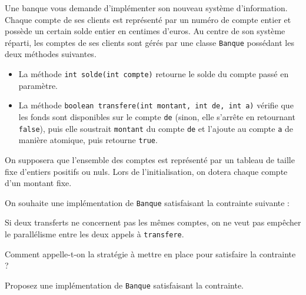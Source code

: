 
\begingroup

\begin{exercice}
  \label{exo:blocking/bank}
  
  Une banque vous demande d'implémenter son nouveau système d'information.
  Chaque compte de ses clients est représenté par un numéro de compte entier et possède un
  certain solde entier en centimes d'euros.
  Au centre de son système réparti, les comptes de ses clients sont gérés
  par une classe \lstinline{Banque} possédant les deux méthodes suivantes.

  \begin{itemize}
  \item La méthode \lstinline{int solde(int compte)} retourne le solde du compte passé en paramètre.
  \item La méthode \lstinline{boolean transfere(int montant, int de, int a)} vérifie que les fonds sont disponibles sur le compte \lstinline{de}
    (sinon, elle s'arrête en retournant \lstinline{false}), puis elle soustrait \lstinline{montant} du compte \lstinline{de} et l'ajoute
    au compte \lstinline{a} de manière atomique, puis retourne \lstinline{true}.
  \end{itemize}
  
  On supposera que l'ensemble des comptes est représenté par un tableau de taille fixe
  d'entiers positifs ou nuls. Lors de l'initialisation, on dotera chaque compte d'un montant fixe.

  On souhaite une implémentation de \lstinline{Banque} satisfaisant la contrainte suivante :
  
  \og Si deux transferts ne concernent pas les mêmes comptes, on ne veut pas empêcher le parallélisme entre les deux appels à \lstinline{transfere}.\fg

  \begin{questions}
  \item Comment appelle-t-on la stratégie à mettre en place pour satisfaire la contrainte ?
  \item Proposez une implémentation de \lstinline{Banque} satisfaisant la contrainte.
  \end{questions}

\end{exercice}

\endgroup
\endinput
